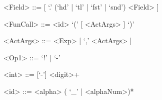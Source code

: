 \begin{grammar}
<Field> ::= [ `.' (`hd' | `tl' | `fst' | `snd') <Field> ]

<FunCall> ::= <id> `(' [ <ActArgs> ] `)'

<ActArgs> ::= <Exp> [ `,' <ActArgs> ]


<Op1> ::= `!' | `-'

<int> ::= [`-'] <digit>+

<id> ::= <alpha> ( `\_' | <alphaNum>)*

\end{grammar}
